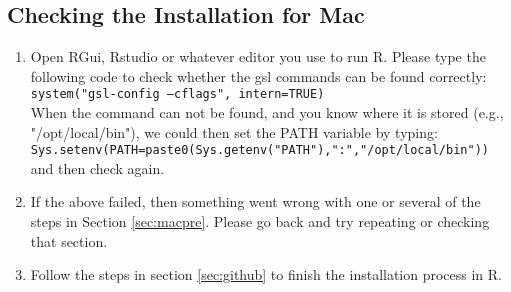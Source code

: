 \documentclass{article}
\begin{document}
\subsection{\Large Checking the Installation for Mac}
\label{sec:maccheck}
\begin{enumerate}
\item Open RGui, Rstudio or whatever editor you use to run R. Please type the following code to check whether the gsl commands can be found correctly:\\ \texttt{system("gsl-config --cflags", intern=TRUE)}\\ When the command can not be found, and you know where it is stored (e.g., "/opt/local/bin"), we could then set the PATH variable by typing: \\
\texttt{Sys.setenv(PATH=paste0(Sys.getenv("PATH"),":","/opt/local/bin"))}\\ and then check again.
\item If the above failed, then something went wrong with one or several of the steps in Section \ref{sec:macpre}. Please go back and try repeating or checking that section.
\item Follow the steps in section \ref{sec:github} to finish the installation process in R.
\end{enumerate}
\end{document}
